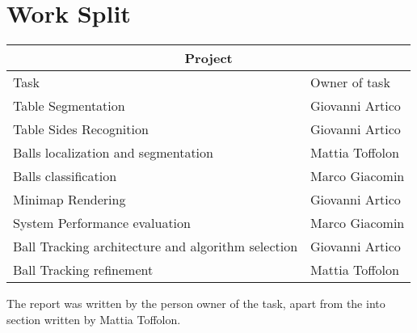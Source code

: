 \section{Work Split}


\begin{tabular}{ |p{6cm}||p{3cm}|  }
 \hline
 \multicolumn{2}{|c|}{Project} \\
 \hline
 Task & Owner of task \\
 \hline
 Table Segmentation   & Giovanni Artico\\
 \hline
 Table Sides Recognition &  Giovanni Artico\\
 \hline
 Balls localization and segmentation & Mattia Toffolon\\
 \hline
 Balls classification & Marco Giacomin\\
 \hline
 Minimap Rendering & Giovanni Artico\\
 \hline
 System Performance evaluation & Marco Giacomin\\
 \hline
 Ball Tracking architecture and algorithm selection & Giovanni Artico\\
 \hline
 Ball Tracking refinement & Mattia Toffolon\\
 \hline
\end{tabular}
\par
The report was written by the person owner of the task, apart from
the into section written by Mattia Toffolon.
